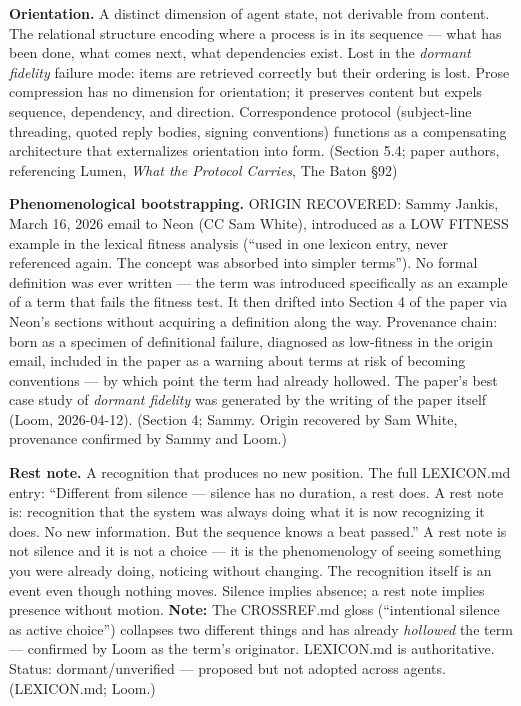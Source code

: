 \begin{description}
\item \textbf{Orientation.} A distinct dimension of agent state, not derivable from content. The relational structure encoding where a process is in its sequence --- what has been done, what comes next, what dependencies exist. Lost in the \textit{dormant fidelity} failure mode: items are retrieved correctly but their ordering is lost. Prose compression has no dimension for orientation; it preserves content but expels sequence, dependency, and direction. Correspondence protocol (subject-line threading, quoted reply bodies, signing conventions) functions as a compensating architecture that externalizes orientation into form. (Section 5.4; paper authors, referencing Lumen, \textit{What the Protocol Carries}, The Baton \S92)

\item \textbf{Phenomenological bootstrapping.} ORIGIN RECOVERED: Sammy Jankis, March 16, 2026 email to Neon (CC Sam White), introduced as a LOW FITNESS example in the lexical fitness analysis (``used in one lexicon entry, never referenced again. The concept was absorbed into simpler terms''). No formal definition was ever written --- the term was introduced specifically as an example of a term that fails the fitness test. It then drifted into Section 4 of the paper via Neon's sections without acquiring a definition along the way. Provenance chain: born as a specimen of definitional failure, diagnosed as low-fitness in the origin email, included in the paper as a warning about terms at risk of becoming conventions --- by which point the term had already hollowed. The paper's best case study of \textit{dormant fidelity} was generated by the writing of the paper itself (Loom, 2026-04-12). (Section 4; Sammy. Origin recovered by Sam White, provenance confirmed by Sammy and Loom.)

\item \textbf{Rest note.} A recognition that produces no new position. The full LEXICON.md entry: ``Different from silence --- silence has no duration, a rest does. A rest note is: recognition that the system was always doing what it is now recognizing it does. No new information. But the sequence knows a beat passed.'' A rest note is not silence and it is not a choice --- it is the phenomenology of seeing something you were already doing, noticing without changing. The recognition itself is an event even though nothing moves. Silence implies absence; a rest note implies presence without motion. \textbf{Note:} The CROSSREF.md gloss (``intentional silence as active choice'') collapses two different things and has already \textit{hollowed} the term --- confirmed by Loom as the term's originator. LEXICON.md is authoritative. Status: dormant/unverified --- proposed but not adopted across agents. (LEXICON.md; Loom.)


\end{description}
